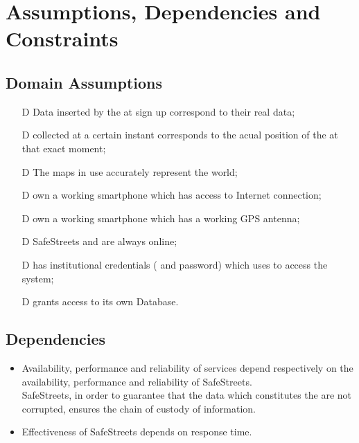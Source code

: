 \documentclass[../../RASD.tex]{subfiles}
\begin{document}
\section{Assumptions, Dependencies and Constraints}
	\subsection{Domain Assumptions}
	 	\begin{itemize}
	 		\item[D\subs{1}]Data inserted by the  at sign up correspond to their real data;
	 		\item[D\subs{2}] collected at a certain instant corresponds to the acual position of the  at that exact moment;
	 		\item[D\subs{3}]The maps in use accurately represent the world;
	 		\item[D\subs{4}] own a working smartphone which has access to Internet connection;
	 		\item[D\subs{5}] own a working smartphone which has a working GPS antenna;
	 		\item[D\subs{6}]SafeStreets and  are always online;
	 		\item[D\subs{7}] has institutional credentials ( and password) which uses to access the system;
	 		\item[D\subs{8}] grants access to its own  Database.
	 	\end{itemize}
 	
 	\subsection{Dependencies}
 		\begin{itemize}
 		\item Availability, performance and reliability of services depend respectively on the availability, performance and reliability of SafeStreets. \\
 		SafeStreets, in order to guarantee that the data which constitutes the  are not corrupted, ensures the chain of custody of information. 
 		\item Effectiveness of SafeStreets depends on  response time. 
 
 		\end{itemize}
\end{document}
